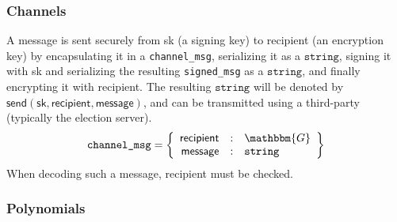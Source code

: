 \documentclass[a4paper]{article}
\newcommand{\G}{\mathbbm{G}}
\newcommand{\jstring}{\texttt{string}}
\begin{document}
\subsubsection{Channels}
\label{channels}

A \textsf{message} is sent securely from \textsf{sk} (a signing key)
to \textsf{recipient} (an encryption key) by encapsulating it in a
\texttt{channel\_msg}, serializing it as a $\jstring$, signing it with
\textsf{sk} and serializing the resulting \texttt{signed\_msg} as a
$\jstring$, and finally encrypting it with \textsf{recipient}. The
resulting $\jstring$ will be denoted by
$\textsf{send}(\textsf{sk},\textsf{recipient},\textsf{message})$, and
can be transmitted using a third-party (typically the election server).
\begin{gather*}
  \texttt{channel\_msg}=\left\{
    \begin{array}{rcl}
      \textsf{recipient}&:&\G\\
      \textsf{message}&:&\jstring
    \end{array}
  \right\}
\end{gather*}
When decoding such a message, \textsf{recipient} must be checked.

\subsubsection{Polynomials}
\label{polynomials}
\end{document}
